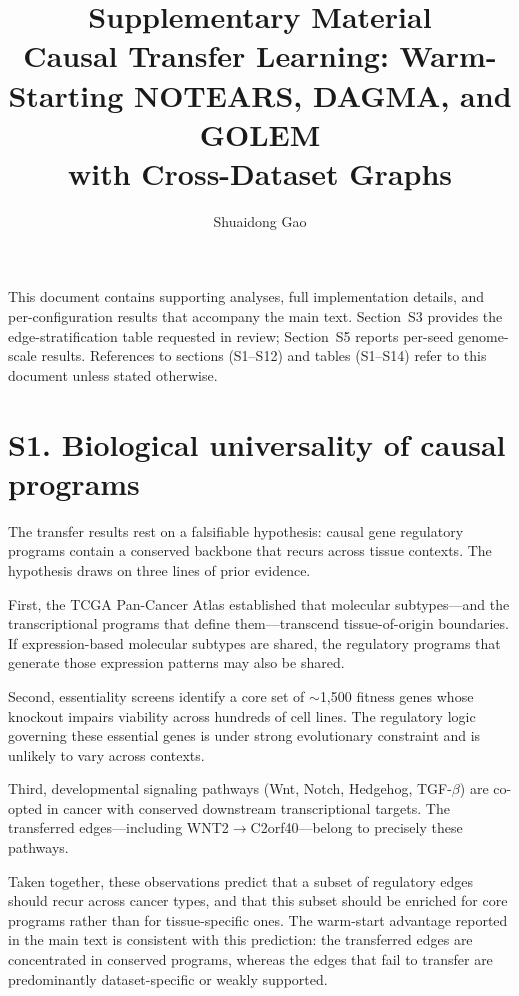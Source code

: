 \documentclass[11pt]{article}
\title{\vspace{-2.0em}Supplementary Material\\[4pt]
\large Causal Transfer Learning: Warm-Starting NOTEARS, DAGMA, and GOLEM\\ with Cross-Dataset Graphs}
\author{Shuaidong Gao}
\date{}
\renewcommand{\to}{\ensuremath{\rightarrow}\allowbreak}
\begin{document}
\maketitle
\vspace{-2.5em}

\noindent This document contains supporting analyses, full implementation details, and
per-configuration results that accompany the main text. Section~S3 provides the
edge-stratification table requested in review; Section~S5 reports per-seed
genome-scale results. References to sections (S1--S12) and tables (S1--S14) refer to
this document unless stated otherwise.

\section*{S1. Biological universality of causal programs}

The transfer results rest on a falsifiable hypothesis: causal gene regulatory programs
contain a conserved backbone that recurs across tissue contexts. The hypothesis draws on
three lines of prior evidence.

First, the TCGA Pan-Cancer Atlas established that molecular subtypes---and the
transcriptional programs that define them---transcend tissue-of-origin
boundaries.\cite{hoadley2018cell} If expression-based molecular subtypes are shared, the
regulatory programs that generate those expression patterns may also be shared.

Second, essentiality screens\cite{tsherniak2017} identify a core set of $\sim$1,500
fitness genes whose knockout impairs viability across hundreds of cell lines. The
regulatory logic governing these essential genes is under strong evolutionary constraint
and is unlikely to vary across contexts.

Third, developmental signaling pathways (Wnt, Notch, Hedgehog, TGF-$\beta$) are co-opted
in cancer with conserved downstream transcriptional targets.\cite{zhan2017wnt} The
transferred edges---including WNT2\to C2orf40---belong to precisely these pathways.

Taken together, these observations predict that a subset of regulatory edges should
recur across cancer types, and that this subset should be enriched for core programs
rather than for tissue-specific ones. The warm-start advantage reported in the main text
is consistent with this prediction: the transferred edges are concentrated in conserved
programs, whereas the edges that fail to transfer are predominantly dataset-specific or
weakly supported.
\end{document}
